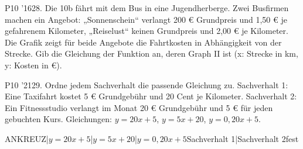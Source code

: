 \documentclass[11pt]{article}
\begin{document}
\begin{pfaufg}{P10 ’16}{\llap{\textasteriskcentered\,}28.}{}
Die 10b fährt mit dem Bus in eine Jugendherberge. Zwei Busfirmen machen ein Angebot: „Sonnenschein“ verlangt 200 € Grundpreis und 1,50 € je gefahrenem Kilometer, „Reiselust“ keinen Grundpreis und 2,00 € je Kilometer. Die Grafik zeigt für beide Angebote die Fahrtkosten in Abhängigkeit von der Strecke. Gib die Gleichung der Funktion an, deren Graph II ist (x: Strecke in km, y: Kosten in €).
\par\smallskip\noindent {}
\par\smallskip\noindent {}\par
{}
\end{pfaufg}
\begin{pfaufg}{P10 ’21}{29.}{}
Ordne jedem Sachverhalt die passende Gleichung zu. Sachverhalt 1: Eine Taxifahrt kostet 5 € Grundgebühr und 20 Cent je Kilometer. Sachverhalt 2: Ein Fitnessstudio verlangt im Monat 20 € Grundgebühr und 5 € für jeden gebuchten Kurs. Gleichungen: $y = 20x + 5$, $y = 5x + 20$, $y = 0{,}20x + 5$.
\par\smallskip\noindent ANKREUZ{|$y = 20x + 5$|$y = 5x + 20$|$y = 0{,}20x + 5$}{Sachverhalt 1|Sachverhalt 2}{fest}\par
{}
\end{pfaufg}
\end{document}
